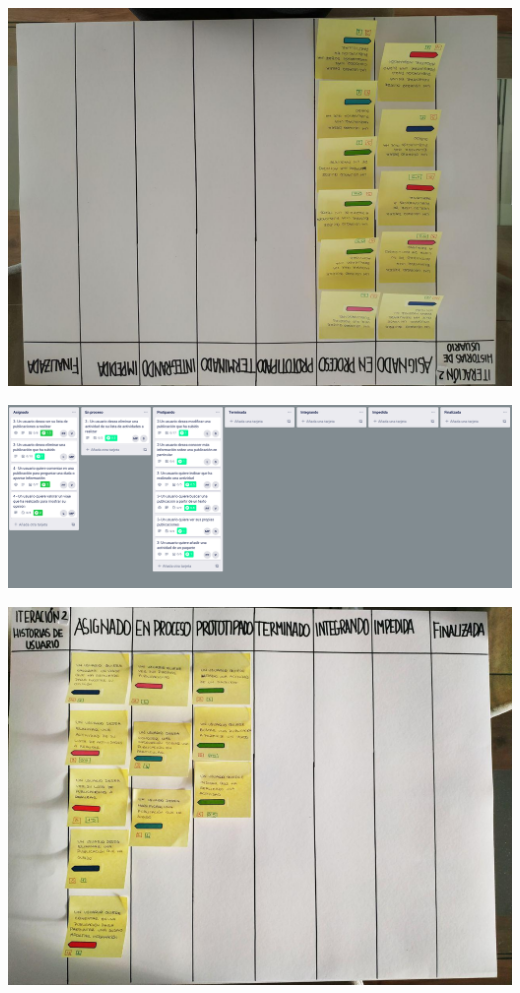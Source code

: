 \documentclass[spanish]{beamer}
\begin{document}
\begin{frame}
	\begin{center}
		\includegraphics[angle=180, scale=0.32]{papel2_2}
	\end{center}
\end{frame}

\begin{frame}
	\begin{center}
		\includegraphics[scale=0.24]{trello2_4}
	\end{center}
\end{frame}

\begin{frame}
	\begin{center}
		\includegraphics[scale=0.34]{papel2_3}
	\end{center}
\end{frame}
\end{document}

